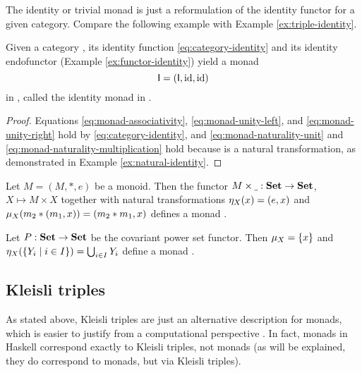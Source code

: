 \begin{example}
  \label{ex:monad-identity}

  The identity or trivial monad is just a reformulation of the
  identity functor for a given category. Compare the following example
  with Example \ref{ex:triple-identity}.

  Given a category , its identity function
  \eqref{eq:category-identity} and its identity endofunctor (Example
  \ref{ex:functor-identity}) yield a monad
  \begin{equation*}
    \mathsf{I} = (\mathsf{I}, \operatorname{id}, \operatorname{id})
  \end{equation*}
  in , called the identity monad in .
  \begin{proof}
    Equations \eqref{eq:monad-associativity},
    \eqref{eq:monad-unity-left}, and \eqref{eq:monad-unity-right} hold
    by \eqref{eq:category-identity}, and
    \eqref{eq:monad-naturality-unit} and
    \eqref{eq:monad-naturality-multiplication} hold because \nat{\id}
    is a natural transformation, as demonstrated in Example
    \ref{ex:natural-identity}.
  \end{proof}
\end{example}

\begin{example}
  Let $M = (M, *, e)$ be a monoid. Then the functor $M \times
  \underline{~} : \mathbf{Set} \to \mathbf{Set}$, $X \mapsto M \times X$ together with
  natural transformations $\eta_{X}(x) = (e, x)$ and
  $\mu_{X}(m_2 * (m_1, x)) = (m_2 * m_1, x)$ defines a monad
  \parencite[596]{poigne-1992}.
\end{example}

\begin{example}
  Let $P : \mathbf{Set} \to \mathbf{Set}$ be the covariant power set functor. Then
  $\mu_{X} = \{ x \}$ and $\eta_{X}(\{Y_i \mid i \in I\})
  = \bigcup_{i \in I} Y_i$ define a monad
  \parencite[596]{poigne-1992}.
\end{example}

\subsection*{Kleisli triples}

As stated above, Kleisli triples are just an alternative description
for monads, which is easier to justify from a computational
perspective \parencite[60]{moggi-1991}. In fact, monads in Haskell
correspond exactly to Kleisli triples, not monads (as will be
explained, they do correspond to monads, but via Kleisli triples).

